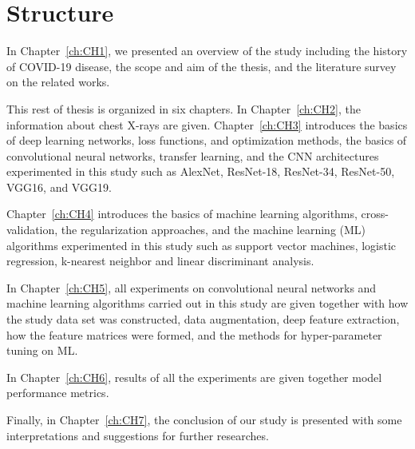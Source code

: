 \begin{landscape}
\begin{table}[]
\begin{tabular}{lllcccc}
		\end{tabular}
	\end{table}
\end{landscape}

\section{Structure}

In Chapter~\ref{ch:CH1}, we presented an overview of the study including the history of COVID-19 disease, the scope and aim of the thesis, and the literature survey on the related works.

This rest of thesis is organized in six chapters. In Chapter~\ref{ch:CH2}, the information about chest X-rays are given.
Chapter~\ref{ch:CH3} introduces the basics of deep learning networks, loss functions, and optimization methods, the basics of convolutional neural networks, transfer learning, and the CNN architectures experimented in this study such as AlexNet, ResNet-18, ResNet-34, ResNet-50, VGG16, and VGG19.

Chapter~\ref{ch:CH4} introduces the basics of machine learning algorithms, cross-validation, the regularization approaches, and the machine learning (ML) algorithms experimented in this study such as support vector machines, logistic regression, k-nearest neighbor and linear discriminant analysis.

In Chapter~\ref{ch:CH5}, all experiments on convolutional neural networks and machine learning algorithms carried out in this study are given together with how the study data set was constructed, data augmentation, deep feature extraction, how the feature matrices were formed, and the methods for hyper-parameter tuning on ML.

In Chapter~\ref{ch:CH6}, results of all the experiments are given together model performance metrics.

Finally, in Chapter~\ref{ch:CH7}, the conclusion of our study is presented with some interpretations and suggestions for further researches.
